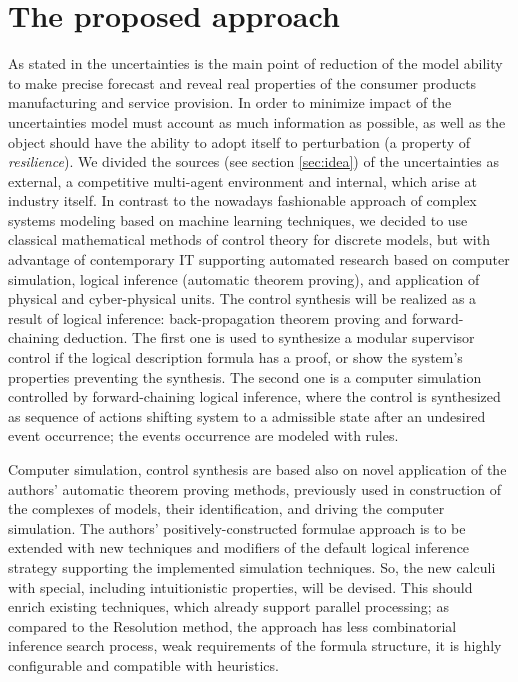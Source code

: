 \documentclass[conference]{IEEEtran}
\begin{document}
\section{The proposed approach}
\label{sec:methods}


As stated in \cite{b6} the uncertainties is the main point of reduction of the model ability to make precise forecast and reveal real properties of the consumer products manufacturing and service provision. In order to minimize impact of the uncertainties model must account as much information as possible, as well as the object should have the ability to adopt itself to perturbation (a property of \emph{resilience}).  We divided the sources (see section \ref{sec:idea}) of the uncertainties as external, a competitive multi-agent environment and internal, which arise at industry itself.  In contrast to the nowadays fashionable approach of complex systems modeling based on machine learning techniques, we decided to use classical mathematical methods of control theory for discrete models, but with advantage of contemporary IT supporting automated research based on computer simulation, logical inference (automatic theorem proving), and application of physical and cyber-physical units.  The control synthesis will be realized as a result of logical inference: back-propagation theorem proving and forward-chaining deduction.  The first one is used to synthesize a modular supervisor control if the logical description formula has a proof, or show the system's properties preventing the synthesis.  The second one is a computer simulation controlled by forward-chaining logical inference, where the control is synthesized as sequence of actions shifting system to a admissible state after an undesired event occurrence; the events occurrence are modeled with rules.

Computer simulation, control synthesis are based also on novel application of the authors’ automatic theorem proving methods, previously used in construction of the complexes of models, their identification, and driving the computer simulation. The authors’ positively-constructed formulae approach is to be extended with new techniques and modifiers of the default logical inference strategy supporting the implemented simulation techniques. So, the new calculi with special, including intuitionistic properties, will be devised. This should enrich existing techniques, which already support parallel processing; as compared to the Resolution method, the approach has less combinatorial inference search process, weak requirements of the formula structure, it is highly configurable and compatible with heuristics.
\end{document}

